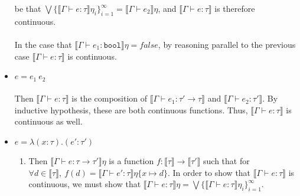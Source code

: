 \documentclass{westhesis}
\begin{document}
\begin{itemize}
be that $\bigvee\{\llbracket \Gamma \vdash e : \tau \rrbracket\eta_i\}^{\infty}_{i=1} = \llbracket \Gamma \vdash e_2 
\rrbracket\eta$, and $\llbracket \Gamma \vdash e : \tau \rrbracket$ is therefore continuous. \\ \\
In the case that $\llbracket \Gamma \vdash e_1 : \texttt{bool} \rrbracket\eta = false$, by reasoning parallel to the previous 
case $\llbracket \Gamma \vdash e : \tau \rrbracket$ is continuous.
 \item $ e = e_1 \ e_2$ \\ \\
 Then $\llbracket \Gamma \vdash e : \tau \rrbracket$ is the composition of $\llbracket \Gamma \vdash e_1 : \tau' \rightarrow
 \tau \rrbracket$ and $\llbracket \Gamma \vdash e_2 : \tau' \rrbracket$. By inductive hypothesis, these are both continuous 
 functions. Thus, $\llbracket \Gamma \vdash e : \tau \rrbracket$ is continuous as well. 
 \item $e = \lambda (x : \tau) . (e' : \tau')$
 \begin{enumerate}
 \item Then $\llbracket \Gamma \vdash e : \tau \rightarrow \tau' \rrbracket\eta$ is a function $f: \llbracket \tau \rrbracket 
 \rightarrow 
 \llbracket \tau'  \rrbracket$ such that for $\forall d \in \llbracket \tau \rrbracket, \ f(d) = \llbracket \Gamma \vdash e' : \tau 
 \rrbracket\eta\{x \mapsto d\}$. In order to show that $\llbracket \Gamma \vdash e : \tau \rrbracket$ is continuous, we 
 must show that $\llbracket \Gamma \vdash e : \tau \rrbracket\eta = \bigvee \{ \llbracket \Gamma \vdash e : \tau \rrbracket
  \eta_i \}^{\infty}_{i=1}$. 
 

\end{enumerate}
\end{itemize}
\end{document}
